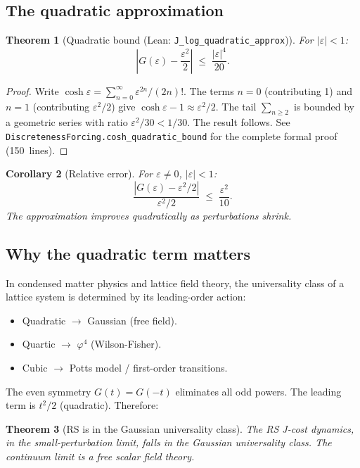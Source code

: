 \documentclass[11pt,a4paper]{article}
\theoremstyle{plain}
\newtheorem{theorem}{Theorem}[section]
\newtheorem{corollary}[theorem]{Corollary}
\theoremstyle{definition}
\theoremstyle{remark}
\newcommand{\Jlog}{G}
\begin{document}
\subsection{The quadratic approximation}

\begin{theorem}[Quadratic bound {\normalfont (Lean: \texttt{J\_log\_quadratic\_approx})}]
\label{thm:quadratic}
For $|\varepsilon| < 1$:
\[
  \left|\Jlog(\varepsilon) - \frac{\varepsilon^2}{2}\right|
  \;\leq\; \frac{|\varepsilon|^4}{20}.
\]
\end{theorem}

\begin{proof}
Write $\cosh \varepsilon = \sum_{n=0}^\infty \varepsilon^{2n}/(2n)!$.
The terms $n = 0$ (contributing 1) and $n = 1$ (contributing
$\varepsilon^2/2$) give $\cosh \varepsilon - 1 \approx \varepsilon^2/2$.
The tail $\sum_{n \geq 2}$ is bounded by a geometric series with ratio
$\varepsilon^2/30 < 1/30$.  The result follows.  See
\texttt{DiscretenessForcing.cosh\_quadratic\_bound} for the complete
formal proof (150~lines).
\end{proof}

\begin{corollary}[Relative error]
\label{cor:relative}
For $\varepsilon \neq 0$, $|\varepsilon| < 1$:
\[
  \frac{|\Jlog(\varepsilon) - \varepsilon^2/2|}{\varepsilon^2/2}
  \;\leq\; \frac{\varepsilon^2}{10}.
\]
The approximation improves quadratically as perturbations shrink.
\end{corollary}

\subsection{Why the quadratic term matters}

In condensed matter physics and lattice field theory, the universality
class of a lattice system is determined by its leading-order action:
\begin{itemize}[nosep]
\item Quadratic $\to$ Gaussian (free field).
\item Quartic $\to$ $\varphi^4$ (Wilson-Fisher).
\item Cubic $\to$ Potts model / first-order transitions.
\end{itemize}

The even symmetry $\Jlog(t) = \Jlog(-t)$ eliminates all odd powers.
The leading term is $t^2/2$ (quadratic).  Therefore:

\begin{theorem}[RS is in the Gaussian universality class]
\label{thm:universality}
The RS J-cost dynamics, in the small-perturbation limit, falls in the
Gaussian universality class.  The continuum limit is a free scalar
field theory.
\end{theorem}
\end{document}
